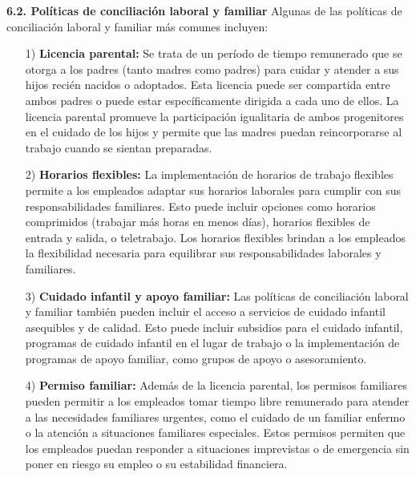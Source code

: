 \documentclass[8pt,a4paper]{beamer}
\begin{document}
{\begin{frame}{}
\begin{block}{\textbf{6.2. Políticas de conciliación laboral y familiar}}
Algunas de las políticas de conciliación laboral y familiar más comunes incluyen:
\begin{enumerate}
\setlength{\parskip}{3px}
\justifying
\item[1)] \textbf{Licencia parental:} Se trata de un período de tiempo remunerado que se otorga a los padres (tanto madres como padres) para cuidar y atender a sus hijos recién nacidos o adoptados. Esta licencia puede ser compartida entre ambos padres o puede estar específicamente dirigida a cada uno de ellos. La licencia parental promueve la participación igualitaria de ambos progenitores en el cuidado de los hijos y permite que las madres puedan reincorporarse al trabajo cuando se sientan preparadas.


\end{enumerate}
\end{block}
\end{frame}

\begin{frame}{}
\begin{block}{}
\setlength{\parskip}{3px}
\justifying
\begin{enumerate}
\setlength{\parskip}{3px}
\justifying
\item[2)] \textbf{Horarios flexibles:} La implementación de horarios de trabajo flexibles permite a los empleados adaptar sus horarios laborales para cumplir con sus responsabilidades familiares. Esto puede incluir opciones como horarios comprimidos (trabajar más horas en menos días), horarios flexibles de entrada y salida, o teletrabajo. Los horarios flexibles brindan a los empleados la flexibilidad necesaria para equilibrar sus responsabilidades laborales y familiares.

\item[3)] \textbf{Cuidado infantil y apoyo familiar:} Las políticas de conciliación laboral y familiar también pueden incluir el acceso a servicios de cuidado infantil asequibles y de calidad. Esto puede incluir subsidios para el cuidado infantil, programas de cuidado infantil en el lugar de trabajo o la implementación de programas de apoyo familiar, como grupos de apoyo o asesoramiento.

\item[4)] \textbf{Permiso familiar:} Además de la licencia parental, los permisos familiares pueden permitir a los empleados tomar tiempo libre remunerado para atender a las necesidades familiares urgentes, como el cuidado de un familiar enfermo o la atención a situaciones familiares especiales. Estos permisos permiten que los empleados puedan responder a situaciones imprevistas o de emergencia sin poner en riesgo su empleo o su estabilidad financiera.
\end{enumerate}
\end{block}
\end{frame}


}
\end{document}
